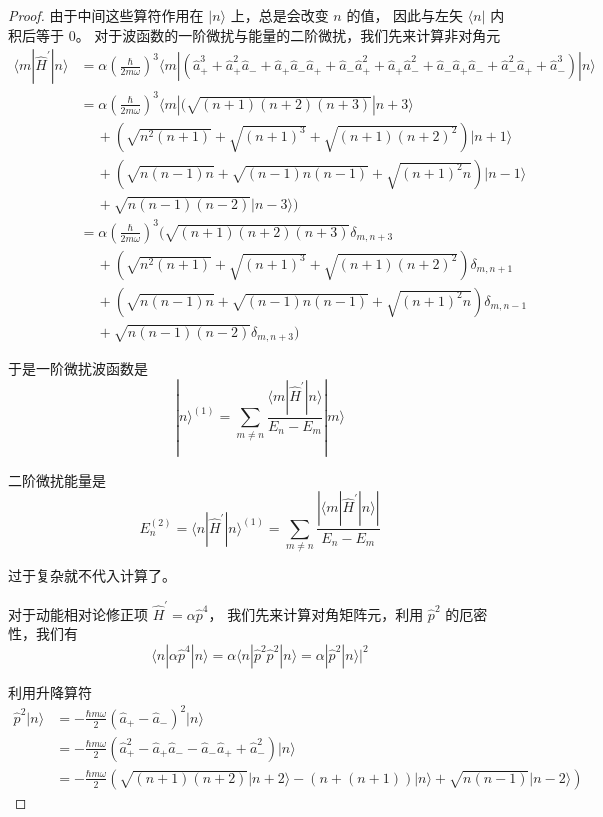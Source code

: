 \begin{proof}
由于中间这些算符作用在 $|n\rangle$ 上，总是会改变 $n$ 的值，
因此与左矢 $\langle n|$ 内积后等于 $0$。
对于波函数的一阶微扰与能量的二阶微扰，我们先来计算非对角元
$$\begin{aligned}
\langle m| \hat{H}^{\prime}|n\rangle& = \alpha\left(\frac{\hbar}{2 m \omega}\right)^{3}\langle m|\left(\hat{a}_{+}^{3}+\hat{a}_{+}^{2} \hat{a}_{-}+\hat{a}_{+} \hat{a}_{-} \hat{a}_{+}+\hat{a}_{-} \hat{a}_{+}^{2}+\hat{a}_{+} \hat{a}_{-}^{2}+\hat{a}_{-} \hat{a}_{+} \hat{a}_{-}+\hat{a}_{-}^{2} \hat{a}_{+}+\hat{a}_{-}^{3}\right)|n\rangle \\
& = \alpha\left(\frac{\hbar}{2 m \omega}\right)^{3}\langle m|(\sqrt{(n+1)(n+2)(n+3)}|n+3\rangle \\
& \quad\ +\left(\sqrt{n^{2}(n+1)}+\sqrt{(n+1)^{3}}+\sqrt{(n+1)(n+2)^{2}}\right)|n+1\rangle \\
& \quad\ +\left(\sqrt{n(n-1) n}+\sqrt{(n-1) n(n-1)}+\sqrt{(n+1)^{2} n}\right)|n-1\rangle \\
& \quad\ +\sqrt{n(n-1)(n-2)}|n-3\rangle) \\
&= \alpha\left(\frac{\hbar}{2 m \omega}\right)^{3}\Big(\sqrt{(n+1)(n+2)(n+3)} \delta_{m, n+3} \\
& \quad\ +\left(\sqrt{n^{2}(n+1)}+\sqrt{(n+1)^{3}}+\sqrt{(n+1)(n+2)^{2}}\right) \delta_{m, n+1} \\
& \quad\ +\left(\sqrt{n(n-1) n}+\sqrt{(n-1) n(n-1)}+\sqrt{(n+1)^{2} n}\right) \delta_{m, n-1} \\
& \quad\ +\sqrt{n(n-1)(n-2)} \delta_{m, n+3}\Big)
\end{aligned}$$

于是一阶微扰波函数是
$$|n\rangle^{(1)}=\sum_{m \neq n} \frac{\langle m| \hat{H}^{\prime}|n\rangle}{E_{n}-E_{m}}|m\rangle$$

二阶微扰能量是
$$E_{n}^{(2)}=\langle n| \hat{H}^{\prime}|n\rangle^{(1)}
=\sum_{m \neq n} \frac{\left|\langle m| \hat{H}^{\prime}| n\rangle \right|}{E_{n}-E_{m}}$$

过于复杂就不代入计算了。

对于动能相对论修正项 $\hat{H}^{\prime}=\alpha \hat{p}^{4}$，
我们先来计算对角矩阵元，利用 $\hat{p}^{2}$ 的厄密性，我们有
$$\langle n| \alpha \hat{p}^{4}|n\rangle
=\alpha\langle n| \hat{p}^{2} \hat{p}^{2}|n\rangle
=\alpha|\hat{p}^{2}| n\rangle|^{2}$$

利用升降算符
$$\begin{aligned}
\hat{p}^{2}|n\rangle & =-\frac{\hbar m \omega}{2}\left(\hat{a}_{+}-\hat{a}_{-}\right)^{2}|n\rangle \\
& =-\frac{\hbar m \omega}{2}\left(\hat{a}_{+}^{2}-\hat{a}_{+} \hat{a}_{-}-\hat{a}_{-} \hat{a}_{+}+\hat{a}_{-}^{2}\right)|n\rangle \\
& =-\frac{\hbar m \omega}{2}(\sqrt{(n+1)(n+2)}|n+2\rangle-(n+(n+1))|n\rangle+\sqrt{n(n-1)}|n-2\rangle)
\end{aligned}$$


\end{proof}
